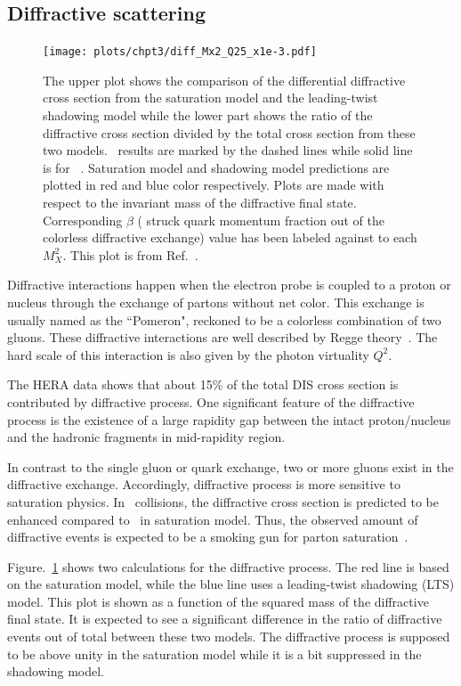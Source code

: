 \subsection{Diffractive scattering}
\begin{figure}
\centering
\texttt{[image: plots/chpt3/diff\_Mx2\_Q25\_x1e-3.pdf]}
\caption[Ratio of diffractive cross section out of the total cross section from saturation model and shadowing model]{
The upper plot shows the comparison of the differential diffractive cross section from the saturation model and the leading-twist shadowing model while the lower part shows the ratio of the diffractive cross section divided by the total cross section from these two models. 
\eAu\ results are marked by the dashed lines while solid line is for \ep\ . Saturation model and shadowing model predictions
are plotted in red and blue color respectively. Plots are made with respect to the invariant mass of the diffractive final state. Corresponding $\beta$ ( struck quark momentum fraction out of the colorless diffractive exchange) value has been labeled against to each $M_{X}^{2}$.
This plot is from Ref.~\cite{Aschenauer:2014a}.}
\label{fig:diff_eA}
\end{figure}

Diffractive interactions happen when the electron probe is coupled to a proton
or nucleus through the exchange of partons without net color. This exchange is
usually named as the ``Pomeron", reckoned to be a colorless combination of two
gluons. These diffractive interactions are well described by Regge
theory~\cite{Irving:1977ea}. The hard scale of this interaction is also given by
the photon virtuality $Q^{2}$.


The HERA data shows that about 15\% of the total DIS cross section is
contributed by diffractive process. One significant feature of the diffractive
process is the existence of a large rapidity gap between the intact
proton/nucleus and the hadronic fragments in mid-rapidity region.

In contrast to the single gluon or quark exchange, two or more gluons exist in
the diffractive exchange. Accordingly, diffractive process is more sensitive to
saturation physics. In \eA\ collisions, the diffractive cross section is predicted to be
enhanced compared to \ep\ in saturation model. Thus, the observed amount of
diffractive events is expected to be a smoking gun for parton
saturation~\cite{Kowalski:2008sa}.

Figure.~\ref{fig:diff_eA} shows two calculations for the diffractive process.
The red line is based on the saturation model, while the blue line uses a
leading-twist shadowing (LTS) model. This plot is shown as a function of the squared mass
of the diffractive final state. It is expected to see a significant difference
in the ratio of diffractive events out of total between these two models. The
diffractive process is supposed to be above unity in the saturation model while it
is a bit suppressed in the shadowing model.


